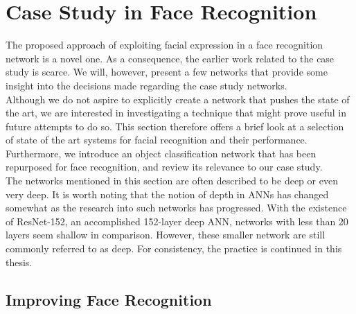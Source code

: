 \begin{comment}
Things that could be added:
- tensorboard and digits are still being worked on. deepvis not so much
- keyword is live / real-time
\end{comment}


\section{Case Study in Face Recognition}

The proposed approach of exploiting facial expression in a face recognition network is a novel one. As a consequence, the earlier work related to the case study is scarce. We will, however, present a few networks that provide some insight into the decisions made regarding the case study networks. \\

\noindent Although we do not aspire to explicitly create a network that pushes the state of the art, we are interested in investigating a technique that might prove useful in future attempts to do so. This section therefore offers a brief look at a selection of state of the art systems for facial recognition and their performance. Furthermore, we introduce an object classification network that has been repurposed for face recognition, and review its relevance to our case study. \\

\noindent The networks mentioned in this section are often described to be deep or even very deep. It is worth noting that the notion of depth in ANNs has changed somewhat as the research into such networks has progressed. With the existence of ResNet-152, an accomplished 152-layer deep ANN, networks with less than 20 layers seem shallow in comparison. However, these smaller network are still commonly referred to as deep. For consistency, the practice is continued in this thesis. 

\subsection{Improving Face Recognition}

